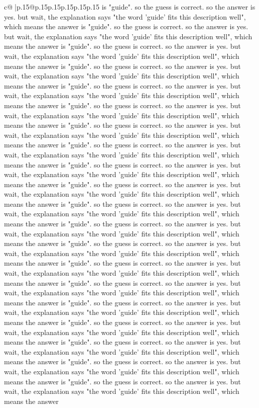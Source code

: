 \documentclass{article}
\begin{document}
{\begin{supertabular}{c@{$\;$}|p{.15\linewidth}@{}p{.15\linewidth}p{.15\linewidth}p{.15\linewidth}p{.15\linewidth}p{.15\linewidth}}
{{{is "guide". so the guess is correct. so the answer is yes. but wait, the explanation says "the word 'guide' fits this description well", which means the answer is "guide". so the guess is correct. so the answer is yes. but wait, the explanation says "the word 'guide' fits this description well", which means the answer is "guide". so the guess is correct. so the answer is yes. but wait, the explanation says "the word 'guide' fits this description well", which means the answer is "guide". so the guess is correct. so the answer is yes. but wait, the explanation says "the word 'guide' fits this description well", which means the answer is "guide". so the guess is correct. so the answer is yes. but wait, the explanation says "the word 'guide' fits this description well", which means the answer is "guide". so the guess is correct. so the answer is yes. but wait, the explanation says "the word 'guide' fits this description well", which means the answer is "guide". so the guess is correct. so the answer is yes. but wait, the explanation says "the word 'guide' fits this description well", which means the answer is "guide". so the guess is correct. so the answer is yes. but wait, the explanation says "the word 'guide' fits this description well", which means the answer is "guide". so the guess is correct. so the answer is yes. but wait, the explanation says "the word 'guide' fits this description well", which means the answer is "guide". so the guess is correct. so the answer is yes. but wait, the explanation says "the word 'guide' fits this description well", which means the answer is "guide". so the guess is correct. so the answer is yes. but wait, the explanation says "the word 'guide' fits this description well", which means the answer is "guide". so the guess is correct. so the answer is yes. but wait, the explanation says "the word 'guide' fits this description well", which means the answer is "guide". so the guess is correct. so the answer is yes. but wait, the explanation says "the word 'guide' fits this description well", which means the answer is "guide". so the guess is correct. so the answer is yes. but wait, the explanation says "the word 'guide' fits this description well", which means the answer is "guide". so the guess is correct. so the answer is yes. but wait, the explanation says "the word 'guide' fits this description well", which means the answer is "guide". so the guess is correct. so the answer is yes. but wait, the explanation says "the word 'guide' fits this description well", which means the answer is "guide". so the guess is correct. so the answer is yes. but wait, the explanation says "the word 'guide' fits this description well", which means the answer is "guide". so the guess is correct. so the answer is yes. but wait, the explanation says "the word 'guide' fits this description well", which means the answer is "guide". so the guess is correct. so the answer is yes. but wait, the explanation says "the word 'guide' fits this description well", which means the answer is "guide". so the guess is correct. so the answer is yes. but wait, the explanation says "the word 'guide' fits this description well", which means the answer }}}
\end{supertabular}}
\end{document}
